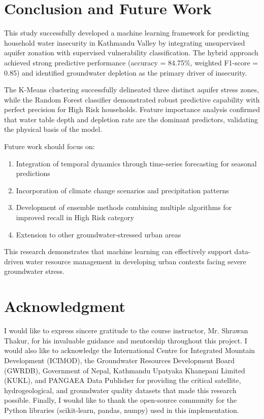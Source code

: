 \documentclass[conference]{IEEEtran}
\begin{document}
\section{Conclusion and Future Work}
This study successfully developed a machine learning framework for predicting household water insecurity in Kathmandu Valley by integrating unsupervised aquifer zonation with supervised vulnerability classification. The hybrid approach achieved strong predictive performance (accuracy = 84.75\%, weighted F1-score = 0.85) and identified groundwater depletion as the primary driver of insecurity.

The K-Means clustering successfully delineated three distinct aquifer stress zones, while the Random Forest classifier demonstrated robust predictive capability with perfect precision for High Risk households. Feature importance analysis confirmed that water table depth and depletion rate are the dominant predictors, validating the physical basis of the model.

Future work should focus on:
\begin{enumerate}
\item Integration of temporal dynamics through time-series forecasting for seasonal predictions
\item Incorporation of climate change scenarios and precipitation patterns
\item Development of ensemble methods combining multiple algorithms for improved recall in High Risk category
\item Extension to other groundwater-stressed urban areas 
\end{enumerate}

This research demonstrates that machine learning can effectively support data-driven water resource management in developing urban contexts facing severe groundwater stress.

\section*{Acknowledgment}
I would like to express sincere gratitude to the course instructor, Mr. Shrawan Thakur, for his invaluable guidance and mentorship throughout this project. I would also like to acknowledge the International Centre for Integrated Mountain Development (ICIMOD), the Groundwater Resources Development Board (GWRDB), Government of Nepal, Kathmandu Upatyaka Khanepani Limited (KUKL), and PANGAEA Data Publisher for providing the critical satellite, hydrogeological, and groundwater quality datasets that made this research possible. Finally, I woukd like to thank the open-source community for the Python libraries (scikit-learn, pandas, numpy) used in this implementation.
\end{document}

